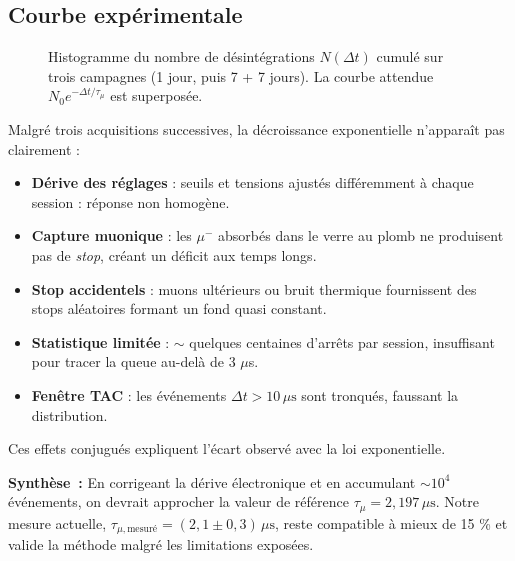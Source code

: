 \documentclass[a4paper,12pt,twoside]{article}
\begin{document}
\subsection*{Courbe expérimentale}
\vspace{-0.5em}
\begin{figure}[H]
  \centering
  \caption{Histogramme du nombre de désintégrations $N(\Delta t)$ cumulé sur trois campagnes (1 jour, puis 7 + 7 jours). La courbe attendue $N_0 e^{-\Delta t/\tau_\mu}$ est superposée.}
  \label{fig:muon_lifetime_curve}
\end{figure}

\begin{center}
\begin{tcolorbox}[colback=red!5!white, colframe=red!80!black, title=Limites et problèmes de la mesure du temps de vie]
  Malgré trois acquisitions successives, la décroissance exponentielle n'apparaît pas clairement :
  \begin{itemize}
  \item \textbf{Dérive des réglages} : seuils et tensions ajustés différemment à chaque session : réponse non homogène.  
  \item \textbf{Capture muonique} : les $\mu^-$ absorbés dans le verre au plomb ne produisent pas de \textit{stop}, créant un déficit aux temps longs.  
  \item \textbf{Stop accidentels} : muons ultérieurs ou bruit thermique fournissent des stops aléatoires formant un fond quasi constant.  
  \item \textbf{Statistique limitée} : $\sim$ quelques centaines d'arrêts par session, insuffisant pour tracer la queue au-delà de 3 $\mu$s.  
  \item \textbf{Fenêtre TAC} : les événements $\Delta t>10\,\mu\text{s}$ sont tronqués, faussant la distribution.  
\end{itemize}
Ces effets conjugués expliquent l'écart observé avec la loi exponentielle.
\end{tcolorbox}
\end{center}

\begin{remarque}
  \textbf{Synthèse~:} En corrigeant la dérive électronique et en accumulant $\sim 10^4$ événements, on devrait approcher la valeur de référence $\tau_\mu=2{,}197\,\mu\text{s}$.  
  Notre mesure actuelle, $\tau_{\mu,\text{mesuré}}=(2,1\pm0,3)\,\mu\text{s}$, reste compatible à mieux de 15 \% et valide la méthode malgré les limitations exposées.
\end{remarque}
\end{document}
